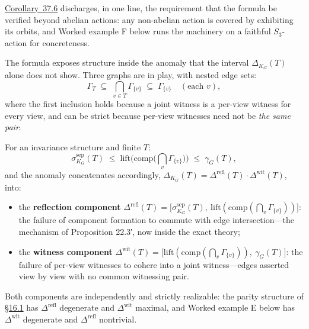 \hyperlink{stmt:37.6}{Corollary~37.6} discharges, in one line, the requirement that the formula be verified beyond abelian actions: any non-abelian action is covered by exhibiting its orbits, and Worked example F below runs the machinery on a faithful \(S_3\)-action for concreteness.


The formula exposes structure inside the anomaly that the interval \(\Delta_{K_G}(T)\) alone does not show. Three graphs are in play, with nested edge sets:
\[
\Gamma_T \;\subseteq\; \bigcap_{v \in T} \Gamma_{\{v\}} \;\subseteq\; \Gamma_{\{v\}} \quad (\text{each } v),
\]
where the first inclusion holds because a joint witness is a per-view witness for every view, and can be strict because per-view witnesses need not be \emph{the same pair}.

\begin{thmplain}

For an invariance structure and finite \(T\):
\[
\sigma^{\mathrm{sep}}_{K_G}(T)
\;\le\;
\mathrm{lift}\Big(\mathrm{comp}\Big(\bigcap_v \Gamma_{\{v\}}\Big)\Big)
\;\le\;
\gamma_G(T),
\]
and the anomaly concatenates accordingly, \(\Delta_{K_G}(T) = \Delta^{\mathrm{refl}}(T) \cdot \Delta^{\mathrm{wit}}(T)\), into:

\begin{itemize}
\tightlist
\item
  the \textbf{reflection component} \(\Delta^{\mathrm{refl}}(T) = \big[\sigma^{\mathrm{sep}}_{K_G}(T),\ \mathrm{lift}(\mathrm{comp}(\bigcap_v \Gamma_{\{v\}}))\big]\): the failure of component formation to commute with edge intersection---\hspace{0pt}the mechanism of Proposition 22.3′, now inside the exact theory;
\item
  the \textbf{witness component} \(\Delta^{\mathrm{wit}}(T) = \big[\mathrm{lift}(\mathrm{comp}(\bigcap_v \Gamma_{\{v\}})),\ \gamma_G(T)\big]\): the failure of per-view witnesses to cohere into a joint witness---\hspace{0pt}edges asserted view by view with no common witnessing pair.
\end{itemize}

Both components are independently and strictly realizable: the parity structure of \hyperlink{sec:16.1}{§16.1} has \(\Delta^{\mathrm{refl}}\) degenerate and \(\Delta^{\mathrm{wit}}\) maximal, and Worked example E below has \(\Delta^{\mathrm{wit}}\) degenerate and \(\Delta^{\mathrm{refl}}\) nontrivial.
\end{thmplain}

